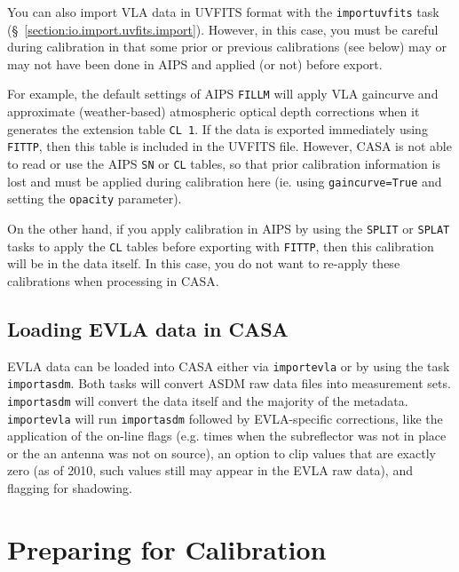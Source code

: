 You can also import VLA data in UVFITS format with the 
{\tt importuvfits} task (\S~\ref{section:io.import.uvfits.import}).
However, in this case, you must be careful during calibration in
that some prior or previous calibrations (see below) may or may not
have been done in AIPS and applied (or not) before export.

For example, the default settings of AIPS {\tt FILLM} will apply
VLA gaincurve and approximate (weather-based) atmospheric optical
depth corrections when it generates the extension table {\tt CL 1}.
If the data is exported immediately using {\tt FITTP}, then this 
table is included in the UVFITS file.  However, CASA is not able
to read or use the AIPS {\tt SN} or {\tt CL} tables, so that 
prior calibration information is lost and must be applied during
calibration here (ie. using {\tt gaincurve=True} and setting the
{\tt opacity} parameter).  

On the other hand, if you apply calibration in AIPS by using the
{\tt SPLIT} or {\tt SPLAT} tasks to apply the {\tt CL} tables before
exporting with {\tt FITTP}, then this calibration will be in the
data itself.  In this case, you do not want to re-apply these
calibrations when processing in CASA.

\subsection{Loading EVLA data in CASA}
\label{section:cal.flow.evla}

EVLA data can be loaded into CASA either via {\tt importevla} or by
using the task {\tt importasdm}. Both tasks will convert ASDM raw data
files into measurement sets. {\tt importasdm} will convert the data
itself and the majority of the metadata. {\tt importevla} will run
{\tt importasdm} followed by EVLA-specific corrections, like the
application of the on-line flags (e.g. times when the subreflector was
not in place or the an antenna was not on source), an option to clip
values that are exactly zero (as of 2010, such values still may appear
in the EVLA raw data), and flagging for shadowing.


\section{Preparing for Calibration}
\label{section:cal.prior}

